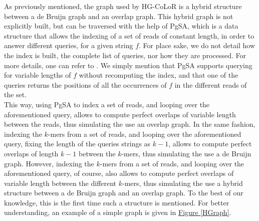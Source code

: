 \documentclass[long, final]{jobim2017}
\begin{document}
As previously mentioned, the graph used by HG-CoLoR is a hybrid structure between a de Bruijn graph and an overlap graph. This hybrid graph is not
explicitly built, but can be traversed with the help of PgSA, which is a data structure that allows the indexing of a set of reads of constant length, in order to answer different queries, for a given string $f$. For place sake, we do not detail how the index is built, the complete list of queries, nor how they are processed. For more details, one can refer to \cite{Kowalski2015}. We simply mention that PgSA supports querying for variable lengths of $f$ without recomputing the index, and that one of the queries returns the positions of all the occurrences of $f$ in the different reads of the set. \\
\indent This way, using PgSA to index a set of reads, and looping over the aforementioned query, allows to compute perfect overlaps of variable length between the reads, thus simulating the use an overlap graph. In the same fashion, indexing the $k$-mers from a set of reads, and looping over the aforementioned query, fixing the length of the queries strings as $k-1$, allows to compute perfect overlaps of length $k-1$ between the $k$-mers, thus simulating the use a de Bruijn graph. However, indexing the $k$-mers from a set of reads, and looping over the aforementioned query, of course, also allows to compute perfect overlaps of variable length between the different $k$-mers, thus simulating the use a hybrid structure between a de Bruijn graph and an overlap graph. To the best of our knowledge, this is the first time such a structure is mentioned. For better understanding, an example of a simple graph is given in \hyperref[HGraph]{Figure \ref*{HGraph}}.
\end{document}
